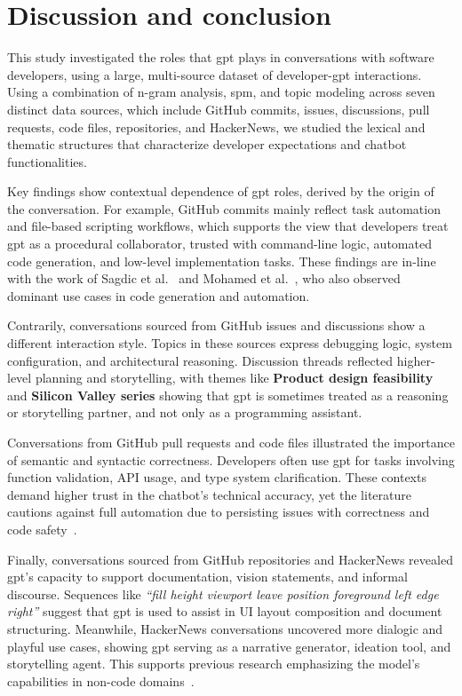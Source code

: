 \chapter{Discussion and conclusion}\label{conclusions}
This study investigated the roles that \acrshort{gpt} plays in conversations with software developers, using a large, multi-source dataset of developer-\acrshort{gpt} interactions. Using a combination of n-gram analysis, \acrfull{spm}, and topic modeling across seven distinct data sources, which include GitHub commits, issues, discussions, pull requests, code files, repositories, and HackerNews, we studied the lexical and thematic structures that characterize developer expectations and chatbot functionalities.

Key findings show contextual dependence of \acrshort{gpt} roles, derived by the origin of the conversation. For example, GitHub commits mainly reflect task automation and file-based scripting workflows, which supports the view that developers treat \acrshort{gpt} as a procedural collaborator, trusted with command-line logic, automated code generation, and low-level implementation tasks. These findings are in-line with the work of Sagdic et al.~\cite{sagdic2024-devgpt-taxonomy} and Mohamed et al.~\cite{Mohamed2024-topics}, who also observed dominant use cases in code generation and automation.

Contrarily, conversations sourced from GitHub issues and discussions show a different interaction style. Topics in these sources express debugging logic, system configuration, and architectural reasoning. Discussion threads reflected higher-level planning and storytelling, with themes like \textbf{Product design feasibility} and \textbf{Silicon Valley series} showing that \acrshort{gpt} is sometimes treated as a reasoning or storytelling partner, and not only as a programming assistant.

Conversations from GitHub pull requests and code files illustrated the importance of semantic and syntactic correctness. Developers often use \acrshort{gpt} for tasks involving function validation, API usage, and type system clarification. These contexts demand higher trust in the chatbot's technical accuracy, yet the literature cautions against full automation due to persisting issues with correctness and code safety~\cite{siddiq2023generate, gpt-code-security-quality, clark2024-quantitative-quality-analysis}.

Finally, conversations sourced from GitHub repositories and HackerNews revealed \acrshort{gpt}'s capacity to support documentation, vision statements, and informal discourse. Sequences like \textit{``fill height viewport leave position foreground left edge right''} suggest that \acrshort{gpt} is used to assist in UI layout composition and document structuring. Meanwhile, HackerNews conversations uncovered more dialogic and playful use cases, showing \acrshort{gpt} serving as a narrative generator, ideation tool, and storytelling agent. This supports previous research emphasizing the model's capabilities in non-code domains~\cite{fi15060192}.

